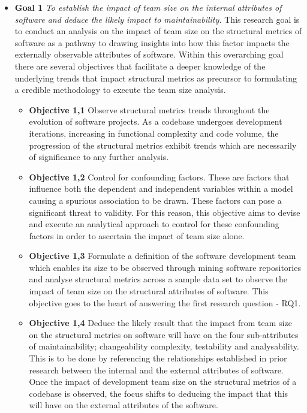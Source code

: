 \begin{itemize}
\item  \textbf{Goal 1} \textit{To establish the impact of team size on the internal attributes of software and deduce the likely impact to maintainability.} 
This research goal is to conduct an analysis on the impact of team size on the structural metrics of software as a pathway to drawing insights into how this factor impacts the externally observable attributes of software. Within this overarching goal there are several objectives that facilitate a deeper knowledge of the underlying trends that impact structural metrics as precursor to formulating a credible methodology to execute the team size analysis.
\begin{itemize}
\item \textbf{Objective 1,1} Observe structural metrics trends throughout the evolution of software projects. As a codebase undergoes development iterations, increasing in functional complexity and code volume, the progression of the structural metrics exhibit trends which are necessarily of significance to any further analysis. 
\item \textbf{Objective 1,2} Control for confounding factors. These are factors that influence both the dependent and independent variables within a model causing a spurious association to be drawn. These factors can pose a significant threat to validity. For this reason, this objective aims to devise and execute an analytical approach to control for these confounding factors in order to ascertain the impact of team size alone.
\item \textbf{Objective 1,3} Formulate a definition of the software development team which enables its size to be observed through mining software repositories and analyse structural metrics across a sample data set to observe the impact of team size on the structural attributes of software. This objective goes to the heart of answering the first research question - RQ1.
\item \textbf{Objective 1,4} Deduce the likely result that the impact from team size on the structural metrics on software will have on the four sub-attributes of maintainability; changeability complexity, testability and analysability. This is to be done by referencing the relationships established in prior research between the internal and the external attributes of software. Once the impact of development team size on the structural metrics of a codebase is observed, the focus shifts to deducing the impact that this will have on the external attributes of the software.

\end{itemize}
\end{itemize}

